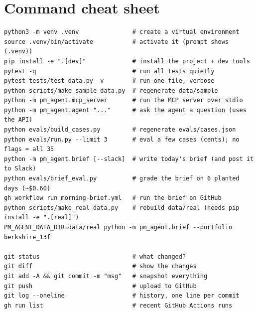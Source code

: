 \documentclass[11pt]{article}
\begin{document}
\section{Command cheat sheet}

\begin{lstlisting}[style=plain]
python3 -m venv .venv               # create a virtual environment
source .venv/bin/activate           # activate it (prompt shows (.venv))
pip install -e ".[dev]"             # install the project + dev tools
pytest -q                           # run all tests quietly
pytest tests/test_data.py -v        # run one file, verbose
python scripts/make_sample_data.py  # regenerate data/sample
python -m pm_agent.mcp_server       # run the MCP server over stdio
python -m pm_agent.agent "..."      # ask the agent a question (uses the API)
python evals/build_cases.py         # regenerate evals/cases.json
python evals/run.py --limit 3       # eval a few cases (cents); no flags = all 35
python -m pm_agent.brief [--slack]  # write today's brief (and post it to Slack)
python evals/brief_eval.py          # grade the brief on 6 planted days (~$0.60)
gh workflow run morning-brief.yml   # run the brief on GitHub
python scripts/make_real_data.py    # rebuild data/real (needs pip install -e ".[real]")
PM_AGENT_DATA_DIR=data/real python -m pm_agent.brief --portfolio berkshire_13f

git status                          # what changed?
git diff                            # show the changes
git add -A && git commit -m "msg"   # snapshot everything
git push                            # upload to GitHub
git log --oneline                   # history, one line per commit
gh run list                         # recent GitHub Actions runs
\end{lstlisting}
\end{document}
